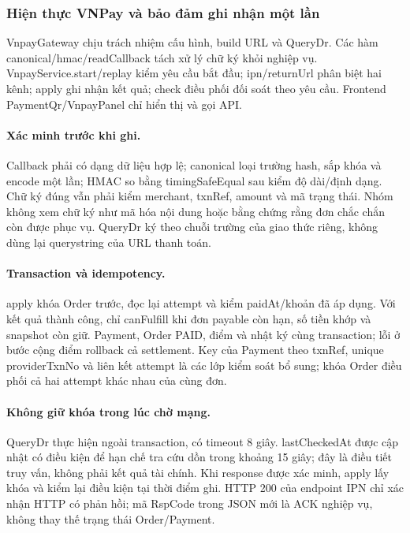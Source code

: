 \subsubsection{Hiện thực VNPay và bảo đảm ghi nhận một lần}
\label{sec:vnpay-implementation}
VnpayGateway chịu trách nhiệm cấu hình, build URL và QueryDr. Các hàm canonical/hmac/readCallback tách xử lý chữ ký khỏi nghiệp vụ. VnpayService.start/replay kiểm yêu cầu bắt đầu; ipn/returnUrl phân biệt hai kênh; apply ghi nhận kết quả; check điều phối đối soát theo yêu cầu. Frontend PaymentQr/VnpayPanel chỉ hiển thị và gọi API.

\paragraph{Xác minh trước khi ghi.}
Callback phải có dạng dữ liệu hợp lệ; canonical loại trường hash, sắp khóa và encode một lần; HMAC so bằng timingSafeEqual sau kiểm độ dài/định dạng. Chữ ký đúng vẫn phải kiểm merchant, txnRef, amount và mã trạng thái. Nhóm không xem chữ ký như mã hóa nội dung hoặc bằng chứng rằng đơn chắc chắn còn được phục vụ. QueryDr ký theo chuỗi trường của giao thức riêng, không dùng lại querystring của URL thanh toán.

\paragraph{Transaction và idempotency.}
apply khóa Order trước, đọc lại attempt và kiểm paidAt/khoản đã áp dụng. Với kết quả thành công, chỉ canFulfill khi đơn payable còn hạn, số tiền khớp và snapshot còn giữ. Payment, Order PAID, điểm và nhật ký cùng transaction; lỗi ở bước cộng điểm rollback cả settlement. Key của Payment theo txnRef, unique providerTxnNo và liên kết attempt là các lớp kiểm soát bổ sung; khóa Order điều phối cả hai attempt khác nhau của cùng đơn.

\paragraph{Không giữ khóa trong lúc chờ mạng.}
QueryDr thực hiện ngoài transaction, có timeout 8 giây. lastCheckedAt được cập nhật có điều kiện để hạn chế tra cứu dồn trong khoảng 15 giây; đây là điều tiết truy vấn, không phải kết quả tài chính. Khi response được xác minh, apply lấy khóa và kiểm lại điều kiện tại thời điểm ghi. HTTP 200 của endpoint IPN chỉ xác nhận HTTP có phản hồi; mã RspCode trong JSON mới là ACK nghiệp vụ, không thay thế trạng thái Order/Payment.

